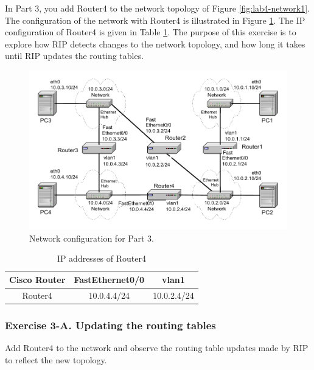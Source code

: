 In Part 3, you add Router4 to the network topology of Figure \ref{fig:lab4-network1}. The configuration of the network with Router4 is illustrated in Figure \ref{fig:lab4-network1-part3}. The IP configuration of Router4 is given in Table \ref{tab:lab4-network1-part3}. The purpose of this exercise is to explore how RIP detects changes to the network topology, and how long it takes until RIP updates the routing tables.

\begin{figure}[ht]
	\centering
	\includegraphics[width=\linewidth]{graphics/lab4-network1-part3-updated.pdf}	
	\caption{Network configuration for Part 3.}
	\label{fig:lab4-network1-part3}
\end{figure}

\begin{table}[h!t]
	\centering
	\begin{tabular}{| c | c | c |}	
		\hline
		\textbf{Cisco Router} & \textbf{FastEthernet0/0} & \textbf{vlan1} \\ \hline
		Router4 & 10.0.4.4/24 & 10.0.2.4/24 \\ \hline
	\end{tabular}
	\caption{IP addresses of Router4}
	\label{tab:lab4-network1-part3}
\end{table}

\subsubsection*{Exercise 3-A. Updating the routing tables}

Add Router4 to the network and observe the routing table updates made by RIP to reflect the new topology.

